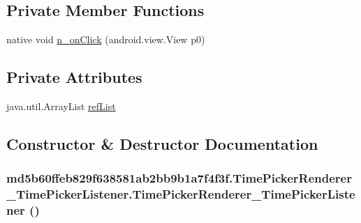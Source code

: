 \subsection*{Private Member Functions}
\begin{CompactItemize}
\item 
native void \hyperlink{classmd5b60ffeb829f638581ab2bb9b1a7f4f3f_1_1_time_picker_renderer___time_picker_listener_cfc5e1b29903c5f20ee30bc52df7cf88}{n\_\-onClick} (android.view.View p0)
\end{CompactItemize}
\subsection*{Private Attributes}
\begin{CompactItemize}
\item 
java.util.ArrayList \hyperlink{classmd5b60ffeb829f638581ab2bb9b1a7f4f3f_1_1_time_picker_renderer___time_picker_listener_18f8bcfd23756191ce3ea3ebc49860a8}{refList}
\end{CompactItemize}


\subsection{Constructor \& Destructor Documentation}
\hypertarget{classmd5b60ffeb829f638581ab2bb9b1a7f4f3f_1_1_time_picker_renderer___time_picker_listener_7b31e1545073681e25d683cbd6fb5aa4}{
\subsubsection[{TimePickerRenderer\_\-TimePickerListener}]{\setlength{\rightskip}{0pt plus 5cm}md5b60ffeb829f638581ab2bb9b1a7f4f3f.TimePickerRenderer\_\-TimePickerListener.TimePickerRenderer\_\-TimePickerListener ()}}
\label{classmd5b60ffeb829f638581ab2bb9b1a7f4f3f_1_1_time_picker_renderer___time_picker_listener_7b31e1545073681e25d683cbd6fb5aa4}





